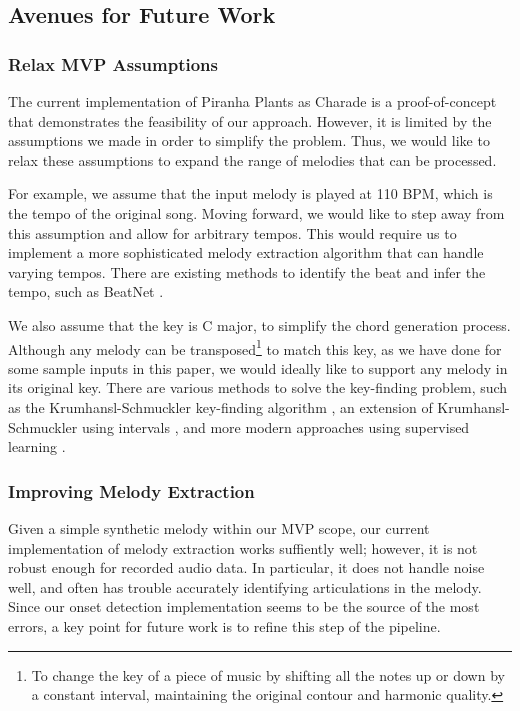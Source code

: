 \subsection{Avenues for Future Work}
\label{sec:avenues}

\subsubsection{Relax MVP Assumptions}

The current implementation of Piranha Plants as Charade is a proof-of-concept that demonstrates the feasibility of our approach. However, it is limited by the assumptions we made in order to simplify the problem. Thus, we would like to relax these assumptions to expand the range of melodies that can be processed.

For example, we assume that the input melody is played at 110 BPM, which is the tempo of the original song. Moving forward, we would like to step away from this assumption and allow for arbitrary tempos. This would require us to implement a more sophisticated melody extraction algorithm that can handle varying tempos. There are existing methods to identify the beat and infer the tempo, such as BeatNet \cite{BeatNet:2021}.

We also assume that the key is C major, to simplify the chord generation process. Although any melody can be transposed\footnote{To change the key of a piece of music by shifting all the notes up or down by a constant interval, maintaining the original contour and harmonic quality.} to match this key, as we have done for some sample inputs in this paper, we would ideally like to support any melody in its original key. There are various methods to solve the key-finding problem, such as the Krumhansl-Schmuckler key-finding algorithm \autocite{KrumhanslSchmuckler:1992}, an extension of Krumhansl-Schmuckler using intervals \autocite{MadsenWidmer:2007}, and more modern approaches using supervised learning \autocite{Mahieu:2016}.

\subsubsection{Improving Melody Extraction}

Given a simple synthetic melody within our MVP scope, our current implementation of melody extraction works suffiently well; however, it is not robust enough for recorded audio data. In particular, it does not handle noise well, and often has trouble accurately identifying articulations in the melody. Since our onset detection implementation seems to be the source of the most errors, a key point for future work is to refine this step of the pipeline.

